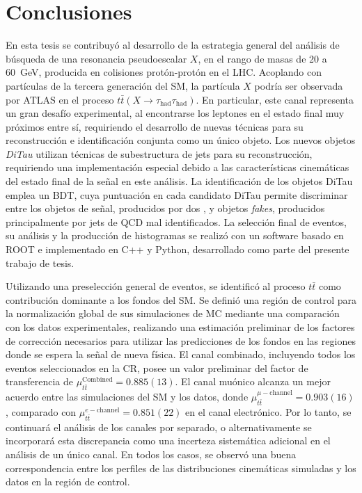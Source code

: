 \chapter*{Conclusiones}

En esta tesis se contribuyó al desarrollo de la estrategia general del análisis de búsqueda de una resonancia pseudoescalar $X$, en el rango de masas de \num{20} a \SI{60}{\GeV}, producida en colisiones protón-protón en el LHC. Acoplando con partículas de la tercera generación del SM, la partícula $X$ podría ser observada por ATLAS en el proceso $t\bar{t}(X \to \tau_{\text{had}} \tau_{\text{had}})$. En particular, este canal representa un gran desafío experimental, al encontrarse los leptones \ttau en el estado final muy próximos entre sí, requiriendo el desarrollo de nuevas técnicas para su reconstrucción e identificación conjunta como un único objeto. Los nuevos objetos \textit{DiTau} utilizan técnicas de subestructura de jets para su reconstrucción, requiriendo una implementación especial debido a las características cinemáticas del estado final de la señal en este análisis. La identificación de los objetos DiTau emplea un BDT, cuya puntuación en cada candidato DiTau permite discriminar entre los objetos de señal, producidos por dos \thads, y objetos \textit{fakes}, producidos principalmente por jets de QCD mal identificados. La selección final de eventos, su análisis y la producción de histogramas se realizó con un software basado en ROOT e implementado en C++ y Python, desarrollado como parte del presente trabajo de tesis.

Utilizando una preselección general de eventos, se identificó al proceso $t\bar{t}$ como contribución dominante a los fondos del SM. Se definió una región de control para la normalización global de sus simulaciones de MC mediante una comparación con los datos experimentales, realizando una estimación preliminar de los factores de corrección necesarios para utilizar las predicciones de los fondos en las regiones donde se espera la señal de nueva física. El canal combinado, incluyendo todos los eventos seleccionados en la CR, posee un valor preliminar del factor de transferencia de $\mu_{t\bar{t}}^{\text{Combined}} = 0.885(13)$. El canal muónico alcanza un mejor acuerdo entre las simulaciones del SM y los datos, donde $\mu_{t\bar{t}}^{\mu-\text{channel}} = 0.903(16)$, comparado con $\mu_{t\bar{t}}^{e-\text{channel}} = 0.851(22)$ en el canal electrónico. Por lo tanto, se continuará el análisis de los canales por separado, o alternativamente se incorporará esta discrepancia como una incerteza sistemática adicional en el análisis de un único canal. En todos los casos, se observó una buena correspondencia entre los perfiles de las distribuciones cinemáticas simuladas y los datos en la región de control.

